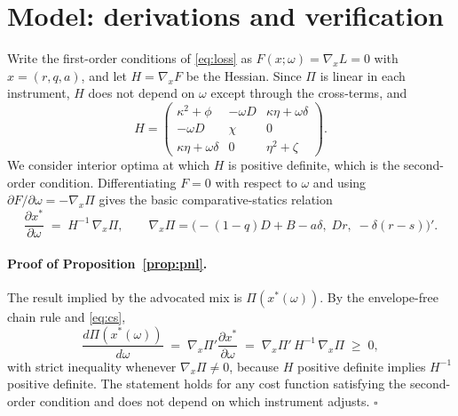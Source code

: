 \documentclass[11pt]{article}
\theoremstyle{plain}
\begin{document}
\clearpage
{}



\clearpage
\appendix
\renewcommand{\thesection}{\Alph{section}}
\section{Model: derivations and verification}\label{app:model}

Write the first-order conditions of \eqref{eq:loss} as $F(x;\omega)=\nabla_x L = 0$ with $x=(r,q,a)$, and let $H=\nabla_x F$ be the Hessian. Since $\Pi$ is linear in each instrument, $H$ does not depend on $\omega$ except through the cross-terms, and
\[
H=\begin{pmatrix} \kappa^2+\phi & -\omega D & \kappa\eta+\omega\delta \\[2pt] -\omega D & \chi & 0 \\[2pt] \kappa\eta+\omega\delta & 0 & \eta^2+\zeta \end{pmatrix}.
\]
We consider interior optima at which $H$ is positive definite, which is the second-order condition. Differentiating $F=0$ with respect to $\omega$ and using $\partial F/\partial\omega = -\nabla_x \Pi$ gives the basic comparative-statics relation
\begin{equation}\label{eq:cs}
\frac{\partial x^*}{\partial \omega} \;=\; H^{-1}\,\nabla_x \Pi, \qquad
\nabla_x \Pi = \bigl(-(1-q)D + B - a\delta,\; D r,\; -\delta(r-s)\bigr)'.
\end{equation}

\paragraph{Proof of Proposition~\ref{prop:pnl}.}
The result implied by the advocated mix is $\Pi(x^*(\omega))$. By the envelope-free chain rule and \eqref{eq:cs},
\[
\frac{d\Pi(x^*(\omega))}{d\omega} \;=\; \nabla_x\Pi' \frac{\partial x^*}{\partial\omega} \;=\; \nabla_x\Pi'\,H^{-1}\,\nabla_x\Pi \;\ge\; 0,
\]
with strict inequality whenever $\nabla_x \Pi \neq 0$, because $H$ positive definite implies $H^{-1}$ positive definite. The statement holds for any cost function satisfying the second-order condition and does not depend on which instrument adjusts. \hfill$\square$
\end{document}
